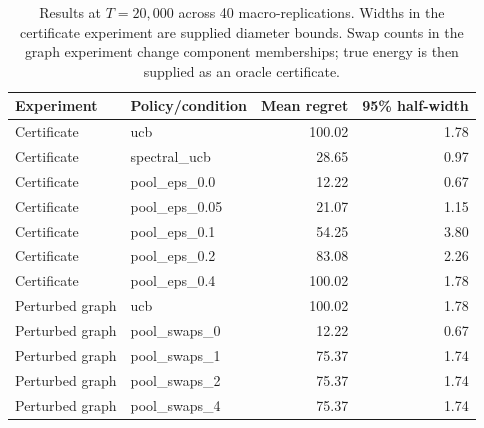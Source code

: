 \begin{table}[t]
\centering\small
\begin{tabular}{llrr}
\toprule
Experiment & Policy/condition & Mean regret & 95\% half-width\\
\midrule

Certificate & ucb & 100.02 & 1.78 \\
Certificate & spectral\_ucb & 28.65 & 0.97 \\
Certificate & pool\_eps\_0.0 & 12.22 & 0.67 \\
Certificate & pool\_eps\_0.05 & 21.07 & 1.15 \\
Certificate & pool\_eps\_0.1 & 54.25 & 3.80 \\
Certificate & pool\_eps\_0.2 & 83.08 & 2.26 \\
Certificate & pool\_eps\_0.4 & 100.02 & 1.78 \\
Perturbed graph & ucb & 100.02 & 1.78 \\
Perturbed graph & pool\_swaps\_0 & 12.22 & 0.67 \\
Perturbed graph & pool\_swaps\_1 & 75.37 & 1.74 \\
Perturbed graph & pool\_swaps\_2 & 75.37 & 1.74 \\
Perturbed graph & pool\_swaps\_4 & 75.37 & 1.74 \\


\bottomrule
\end{tabular}
\caption{Results at $T=20{,}000$ across 40 macro-replications. Widths in the certificate experiment are supplied diameter bounds. Swap counts in the graph experiment change component memberships; true energy is then supplied as an oracle certificate.}
\label{alignment_paper:tab:results}
\end{table}

